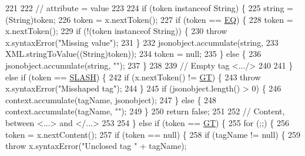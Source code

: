 \begin{DoxyCode}
221 
222 \textcolor{comment}{// attribute = value}
223 
224                 \textcolor{keywordflow}{if} (token instanceof String) \{
225                     \textcolor{keywordtype}{string} = (String)token;
226                     token = x.nextToken();
227                     \textcolor{keywordflow}{if} (token == \hyperlink{classorg_1_1json_1_1_x_m_l_a79c30d409011e7c5bbffe3a9dd487b19}{EQ}) \{
228                         token = x.nextToken();
229                         \textcolor{keywordflow}{if} (!(token instanceof String)) \{
230                             \textcolor{keywordflow}{throw} x.syntaxError(\textcolor{stringliteral}{"Missing value"});
231                         \}
232                         jsonobject.accumulate(\textcolor{keywordtype}{string},
233                                 XML.stringToValue((String)token));
234                         token = null;
235                     \} \textcolor{keywordflow}{else} \{
236                         jsonobject.accumulate(\textcolor{keywordtype}{string}, \textcolor{stringliteral}{""});
237                     \}
238 
239 \textcolor{comment}{// Empty tag <.../>}
240 
241                 \} \textcolor{keywordflow}{else} \textcolor{keywordflow}{if} (token == \hyperlink{classorg_1_1json_1_1_x_m_l_aaa9a255bc94655b02d65b2c8525e5188}{SLASH}) \{
242                     \textcolor{keywordflow}{if} (x.nextToken() != \hyperlink{classorg_1_1json_1_1_x_m_l_a0a9f1aaef15f78d43c532e601546a722}{GT}) \{
243                         \textcolor{keywordflow}{throw} x.syntaxError(\textcolor{stringliteral}{"Misshaped tag"});
244                     \}
245                     \textcolor{keywordflow}{if} (jsonobject.length() > 0) \{
246                         context.accumulate(tagName, jsonobject);
247                     \} \textcolor{keywordflow}{else} \{
248                         context.accumulate(tagName, \textcolor{stringliteral}{""});
249                     \}
250                     \textcolor{keywordflow}{return} \textcolor{keyword}{false};
251 
252 \textcolor{comment}{// Content, between <...> and </...>}
253 
254                 \} \textcolor{keywordflow}{else} \textcolor{keywordflow}{if} (token == \hyperlink{classorg_1_1json_1_1_x_m_l_a0a9f1aaef15f78d43c532e601546a722}{GT}) \{
255                     \textcolor{keywordflow}{for} (;;) \{
256                         token = x.nextContent();
257                         \textcolor{keywordflow}{if} (token == null) \{
258                             \textcolor{keywordflow}{if} (tagName != null) \{
259                                 \textcolor{keywordflow}{throw} x.syntaxError(\textcolor{stringliteral}{"Unclosed tag "} + tagName);

\end{DoxyCode}
